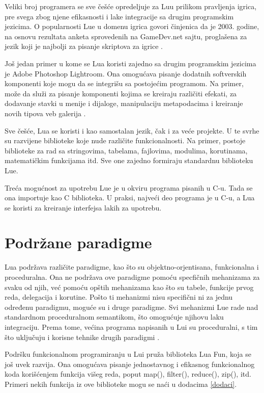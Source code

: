 \documentclass[a4paper]{article}
\begin{document}
Veliki broj programera se sve češće opredeljuje za Luu prilikom pravljenja igrica, pre svega zbog njene efikasnosti i lake integracije sa drugim programskim jezicima. O popularnosti Lue u domenu igrica govori činjenica da je 2003. godine, na osnovu rezultata anketa sprovedenih na GameDev.net sajtu, proglašena za jezik koji je najbolji za pisanje skriptova za igrice \cite{lua_news}. 

Još jedan primer u kome se Lua koristi zajedno sa drugim programskim jezicima je Adobe Photoshop Lightroom. Ona omogućava pisanje dodatnih softverskih komponenti koje mogu da se integrišu sa postojećim programom. Na primer, može da služi za pisanje komponenti kojima se kreiraju različiti efekati, za dodavanje stavki u menije i dijaloge, manipulaciju metapodacima i kreiranje novih tipova veb galerija \cite{adobe}.

Sve češće, Lua se koristi i kao samostalan jezik, čak i za veće projekte. U te svrhe su razvijene biblioteke koje nude različite funkcionalnosti. Na primer, postoje biblioteke za rad sa stringovima, tabelama, fajlovima, modulima, korutinama, matematičkim funkcijama itd. Sve one zajedno formiraju standardnu biblioteku Lue.

Treća mogućnost za upotrebu Lue je u okviru programa pisanih u C-u. Tada se ona importuje kao C biblioteka. U praksi, najveći deo programa je u C-u, a Lua se koristi za kreiranje interfejsa lakih za upotrebu.


\section{Podržane paradigme}
\label{sec:paradigme}


Lua podržava različite paradigme, kao što su objektno-orjentisana, funkcionalna i proceduralna. Ona ne podržava ove paradigme pomoću specfičnih mehanizama za svaku od njih, već pomoću opštih mehanizama kao što su tabele, funkcije prvog reda, delegacija i korutine. Pošto ti mehanizmi nisu specifični ni za jednu određenu paradigmu, moguće su i druge paradigme. Svi mehanizmi Lue rade nad standardnom proceduralnom semantikom, što omogućuje njihovu laku integraciju. Prema tome, većina programa napisanih u Lui su proceduralni, s tim što uključuju i korisne tehnike drugih paradigmi \cite{multiParadigms} .

Podršku funkcionalnom programiranju u Lui pruža biblioteka Lua Fun, koja se još uvek razvija. Ona omogućava pisanje jednostavnog i efikasnog funkcionalnog koda korišćenjem funkcija višeg reda, poput map(), filter(), reduce(), zip(), itd. Primeri nekih funkcija iz ove biblioteke mogu se naći u dodacima \ref{dodaci}.
\end{document}
